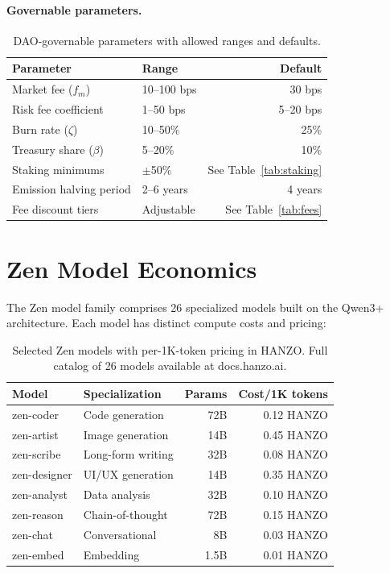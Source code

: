 \documentclass[11pt]{article}
\begin{document}
\paragraph{Governable parameters.}

\begin{table}[H]
\centering
\small
\begin{tabular}{llr}
\toprule
\textbf{Parameter} & \textbf{Range} & \textbf{Default} \\
\midrule
Market fee ($f_m$) & 10--100 bps & 30 bps \\
Risk fee coefficient & 1--50 bps & 5--20 bps \\
Burn rate ($\zeta$) & 10--50\% & 25\% \\
Treasury share ($\beta$) & 5--20\% & 10\% \\
Staking minimums & $\pm$50\% & See Table~\ref{tab:staking} \\
Emission halving period & 2--6 years & 4 years \\
Fee discount tiers & Adjustable & See Table~\ref{tab:fees} \\
\bottomrule
\end{tabular}
\caption{DAO-governable parameters with allowed ranges and defaults.}
\label{tab:governance}
\end{table}

\section{Zen Model Economics}
\label{sec:zen}

The Zen model family comprises 26 specialized models built on the Qwen3+
architecture. Each model has distinct compute costs and pricing:

\begin{table}[H]
\centering
\small
\begin{tabular}{llrr}
\toprule
\textbf{Model} & \textbf{Specialization} & \textbf{Params} &
\textbf{Cost/1K tokens} \\
\midrule
zen-coder & Code generation & 72B & 0.12 HANZO \\
zen-artist & Image generation & 14B & 0.45 HANZO \\
zen-scribe & Long-form writing & 32B & 0.08 HANZO \\
zen-designer & UI/UX generation & 14B & 0.35 HANZO \\
zen-analyst & Data analysis & 32B & 0.10 HANZO \\
zen-reason & Chain-of-thought & 72B & 0.15 HANZO \\
zen-chat & Conversational & 8B & 0.03 HANZO \\
zen-embed & Embedding & 1.5B & 0.01 HANZO \\
\bottomrule
\end{tabular}
\caption{Selected Zen models with per-1K-token pricing in HANZO. Full catalog of 26 models available at docs.hanzo.ai.}
\label{tab:zen}
\end{table}
\end{document}
